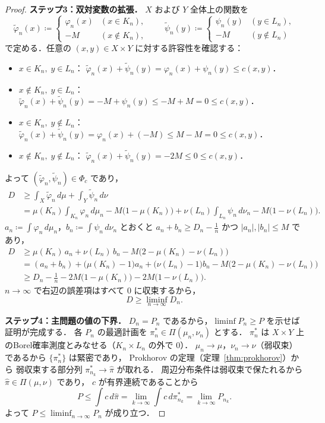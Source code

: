 \documentclass[uplatex, dvipdfmx]{jsarticle}
\begin{document}
\begin{proof}
\textbf{ステップ3：双対変数の拡張．}
$X$ および $Y$ 全体上の関数を
\[
  \tilde{\varphi}_n(x)\coloneqq
  \begin{cases}
    \varphi_n(x) & (x\in K_n),\\
    -M & (x\notin K_n),
  \end{cases}
  \qquad
  \tilde{\psi}_n(y)\coloneqq
  \begin{cases}
    \psi_n(y) & (y\in L_n),\\
    -M & (y\notin L_n)
  \end{cases}
\]
で定める．任意の $(x,y)\in X\times Y$ に対する許容性を確認する：
\begin{itemize}
  \item $x\in K_n,\;y\in L_n$：
    $\tilde{\varphi}_n(x)+\tilde{\psi}_n(y)
    =\varphi_n(x)+\psi_n(y)\le c(x,y)$．
  \item $x\notin K_n,\;y\in L_n$：
    $\tilde{\varphi}_n(x)+\tilde{\psi}_n(y)
    =-M+\psi_n(y)\le -M+M=0\le c(x,y)$．
  \item $x\in K_n,\;y\notin L_n$：
    $\tilde{\varphi}_n(x)+\tilde{\psi}_n(y)
    =\varphi_n(x)+(-M)\le M-M=0\le c(x,y)$．
  \item $x\notin K_n,\;y\notin L_n$：
    $\tilde{\varphi}_n(x)+\tilde{\psi}_n(y)=-2M\le 0\le c(x,y)$．
\end{itemize}
よって $(\tilde{\varphi}_n,\tilde{\psi}_n)\in\Phi_c$ であり，
\begin{align*}
  D
  &\ge \int_X\tilde{\varphi}_n\,d\mu+\int_Y\tilde{\psi}_n\,d\nu \\
  &= \mu(K_n)\int_{K_n}\varphi_n\,d\mu_n
    - M\bigl(1-\mu(K_n)\bigr)
    + \nu(L_n)\int_{L_n}\psi_n\,d\nu_n
    - M\bigl(1-\nu(L_n)\bigr).
\end{align*}
$a_n\coloneqq\int\varphi_n\,d\mu_n$，$b_n\coloneqq\int\psi_n\,d\nu_n$
とおくと $a_n+b_n\ge D_n-\frac{1}{n}$ かつ $|a_n|,|b_n|\le M$ であり，
\begin{align*}
  D
  &\ge \mu(K_n)\,a_n + \nu(L_n)\,b_n - M\bigl(2-\mu(K_n)-\nu(L_n)\bigr) \\
  &= (a_n+b_n)
    + \bigl(\mu(K_n)-1\bigr)a_n
    + \bigl(\nu(L_n)-1\bigr)b_n
    - M\bigl(2-\mu(K_n)-\nu(L_n)\bigr) \\
  &\ge D_n - \tfrac{1}{n}
    - 2M\bigl(1-\mu(K_n)\bigr) - 2M\bigl(1-\nu(L_n)\bigr).
\end{align*}
$n\to\infty$ で右辺の誤差項はすべて $0$ に収束するから，
\[
  D \ge \liminf_{n\to\infty} D_n.
\]

\textbf{ステップ4：主問題の値の下界．}
$D_n=P_n$ であるから，$\liminf P_n\ge P$ を示せば証明が完成する．
各 $P_n$ の最適計画を $\pi_n^*\in\Pi(\mu_n,\nu_n)$ とする．
$\pi_n^*$ は $X\times Y$ 上のBorel確率測度とみなせる（$K_n\times L_n$ の外で $0$）．
$\mu_n\to\mu$，$\nu_n\to\nu$（弱収束）であるから
$\{\pi_n^*\}$ は緊密であり，
Prokhorov の定理（定理~\ref{thm:prokhorov}）から
弱収束する部分列 $\pi_{n_k}^*\to\hat{\pi}$ が取れる．
周辺分布条件は弱収束で保たれるから $\hat{\pi}\in\Pi(\mu,\nu)$ であり，
$c$ が有界連続であることから
\[
  P \le \int c\,d\hat{\pi}
  = \lim_{k\to\infty}\int c\,d\pi_{n_k}^*
  = \lim_{k\to\infty} P_{n_k}.
\]
よって $P\le\liminf_{n\to\infty}P_n$ が成り立つ．


\end{proof}
\end{document}
